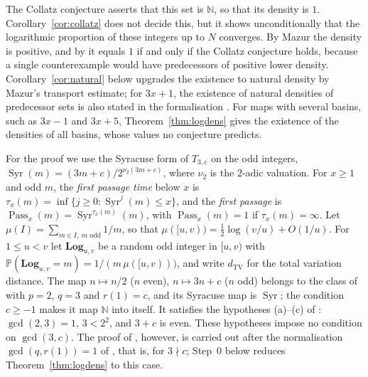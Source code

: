 \documentclass[12pt]{amsart}
\theoremstyle{definition}
\theoremstyle{remark}
\newcommand{\N}{\mathbb{N}}
\begin{document}
The Collatz conjecture asserts that this set is $\N$, so that its density is $1$. Corollary~\ref{cor:collatz} does not decide this, but it shows unconditionally that the logarithmic proportion of these integers up to $N$ converges. By Mazur \cite{Mazur_PD_2026} the density is positive, and by \cite{Mazur_Pred_2026} it equals $1$ if and only if the Collatz conjecture holds, because a single counterexample would have predecessors of positive lower density. Corollary~\ref{cor:natural} below upgrades the existence to natural density by Mazur's transport estimate; for $3x+1$, the existence of natural densities of predecessor sets is also stated in the formalisation \cite{CLT_2026}. For maps with several basins, such as $3x-1$ and $3x+5$, Theorem~\ref{thm:logdens} gives the existence of the densities of all basins, whose values no conjecture predicts.

For the proof we use the Syracuse form of $T_{3,c}$ on the odd integers, $\operatorname{Syr}(m)=(3m+c)/2^{\nu_2(3m+c)}$, where $\nu_2$ is the $2$-adic valuation. For $x\ge1$ and odd $m$, the \emph{first passage time} below $x$ is $\tau_x(m)=\inf\{j\ge0:\operatorname{Syr}^j(m)\le x\}$, and the \emph{first passage} is $\operatorname{Pass}_x(m)=\operatorname{Syr}^{\tau_x(m)}(m)$, with $\operatorname{Pass}_x(m)=1$ if $\tau_x(m)=\infty$. Let $\mu(I)=\sum_{m\in I,\ m\text{ odd}}1/m$, so that $\mu([u,v))=\tfrac12\log(v/u)+O(1/u)$. For $1\le u<v$ let $\mathbf{Log}_{u,v}$ be a random odd integer in $[u,v)$ with $\mathbb P(\mathbf{Log}_{u,v}=m)=1/(m\,\mu([u,v)))$, and write $d_{\mathrm{TV}}$ for the total variation distance. The map $n\mapsto n/2$ ($n$ even), $n\mapsto 3n+c$ ($n$ odd) belongs to the class of \cite[Definition~1.2]{GGM_2025} with $p=2$, $q=3$ and $r(1)=c$, and its Syracuse map is $\operatorname{Syr}$; the condition $c\ge-1$ makes it map $\N$ into itself. It satisfies the hypotheses (a)--(c) of \cite[Theorem~1.3]{GGM_2025}: $\gcd(2,3)=1$, $3<2^{2}$, and $3+c$ is even. These hypotheses impose no condition on $\gcd(3,c)$. The proof of \cite[Proposition~3.5]{GGM_2025}, however, is carried out after the normalisation $\gcd(q,r(1))=1$ of \cite[Section~2.2]{GGM_2025}, that is, for $3\nmid c$; Step~0 below reduces Theorem~\ref{thm:logdens} to this case.
\end{document}
